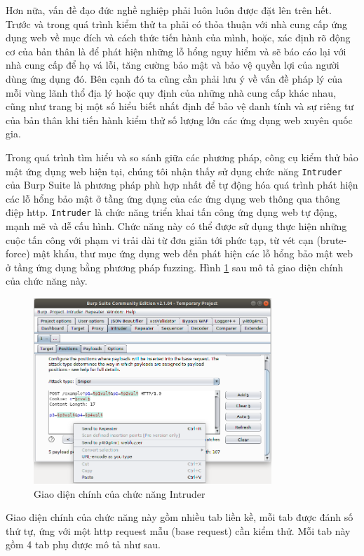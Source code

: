 Hơn nữa, vấn đề đạo đức nghề nghiệp phải luôn luôn được đặt lên trên hết. Trước và trong quá trình kiểm thử ta phải có thỏa thuận với nhà cung cấp ứng dụng web về mục đích và cách thức tiến hành của mình, hoặc, xác định rõ động cơ của bản thân là để phát hiện những lỗ hổng nguy hiểm và sẽ báo cáo lại với nhà cung cấp để họ vá lỗi, tăng cường bảo mật và bảo vệ quyền lợi của người dùng ứng dụng đó. Bên cạnh đó ta cũng cần phải lưu ý về vấn đề pháp lý của mỗi vùng lãnh thổ địa lý hoặc quy định của những nhà cung cấp khác nhau, cũng như trang bị một số hiểu biết nhất định để bảo vệ danh tính và sự riêng tư của bản thân khi tiến hành kiểm thử số lượng lớn các ứng dụng web xuyên quốc gia.\par
Trong quá trình tìm hiểu và so sánh giữa các phương pháp, công cụ kiểm thử bảo mật ứng dụng web hiện tại, chúng tôi nhận thấy sử dụng chức năng \texttt{Intruder} của Burp Suite là phương pháp phù hợp nhất để tự động hóa quá trình phát hiện các lỗ hổng bảo mật ở tầng ứng dụng của các ứng dụng web thông qua thông điệp \acrshort{http}. \texttt{Intruder} là chức năng triển khai tấn công ứng dụng web tự động, mạnh mẽ và dễ cấu hình. Chức năng này có thể được sử dụng thực hiện những cuộc tấn công với phạm vi trải dài từ đơn giản tới phức tạp, từ vét cạn (brute-force) mật khẩu, thư mục ứng dụng web đến phát hiện các lỗ hổng bảo mật web ở tầng ứng dụng bằng phương pháp fuzzing. Hình \ref{fig:send-base-request-1} sau mô tả giao diện chính của chức năng này.
\begin{figure}[H]
    \centering
        \includegraphics[width=0.8\textwidth,keepaspectratio=true]{images/send-base-request.png}
    \caption{Giao diện chính của chức năng Intruder}
    \label{fig:send-base-request-1}
\end{figure}
Giao diện chính của chức năng này gồm nhiều tab liền kề, mỗi tab được đánh số thứ tự, ứng với một \acrshort{http} request mẫu (base request) cần kiểm thử. Mỗi tab này gồm 4 tab phụ được mô tả như sau.
